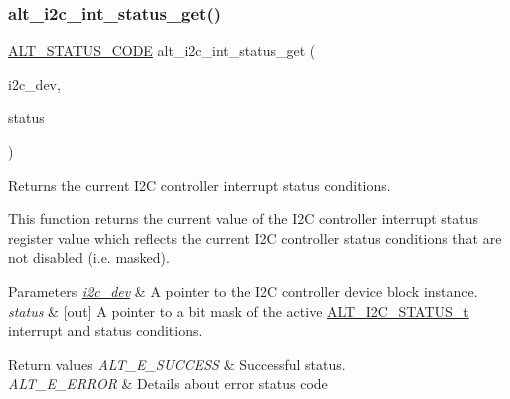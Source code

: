 \subsubsection{\texorpdfstring{alt\_i2c\_int\_status\_get()}{alt\_i2c\_int\_status\_get()}}
{\footnotesize\ttfamily \mbox{\hyperlink{hwlib_8h_abdb0d369f069723ca55d6c94bcaaaa12}{A\+L\+T\+\_\+\+S\+T\+A\+T\+U\+S\+\_\+\+C\+O\+DE}} alt\+\_\+i2c\+\_\+int\+\_\+status\+\_\+get (\begin{DoxyParamCaption}\item[{\mbox{\hyperlink{structALT__I2C__DEV__s}{A\+L\+T\+\_\+\+I2\+C\+\_\+\+D\+E\+V\+\_\+t}} $\ast$}]{i2c\+\_\+dev,  }\item[{uint32\+\_\+t $\ast$}]{status }\end{DoxyParamCaption})}

Returns the current I2C controller interrupt status conditions.

This function returns the current value of the I2C controller interrupt status register value which reflects the current I2C controller status conditions that are not disabled (i.\+e. masked).


\begin{DoxyParams}{Parameters}
{\em \mbox{\hyperlink{structi2c__dev}{i2c\+\_\+dev}}} & A pointer to the I2C controller device block instance.\\
\hline
{\em status} & \mbox{[}out\mbox{]} A pointer to a bit mask of the active \mbox{\hyperlink{group__ALT__I2C_gaff6fbc8f47536dd27035588f0ea138fe}{A\+L\+T\+\_\+\+I2\+C\+\_\+\+S\+T\+A\+T\+U\+S\+\_\+t}} interrupt and status conditions.\\
\hline
\end{DoxyParams}

\begin{DoxyRetVals}{Return values}
{\em A\+L\+T\+\_\+\+E\+\_\+\+S\+U\+C\+C\+E\+SS} & Successful status. \\
\hline
{\em A\+L\+T\+\_\+\+E\+\_\+\+E\+R\+R\+OR} & Details about error status code \\
\hline
\end{DoxyRetVals}
\mbox{\label{group__ALT__I2C__INT_gac5a4221442c1b5fd5aff9672ccf91ad1}} 

